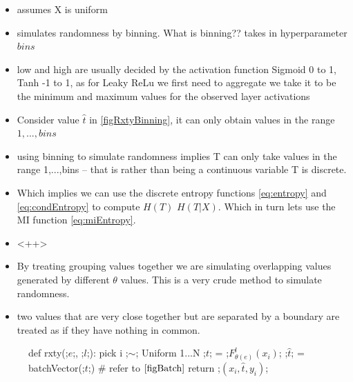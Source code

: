 \documentclass[dissertation.tex]{subfiles}
\begin{document}
\begin{itemize}
  \item{
      assumes X is uniform
    }
  \item{
      simulates randomness by binning. What is binning?? takes in hyperparameter
      $bins$
    }
  \item{
      low and high are usually decided by the activation function
      Sigmoid 0 to 1, Tanh -1 to 1, as for Leaky ReLu we first need to aggregate
      we take it to be the minimum and maximum values for the observed
      layer activations
    }
  \item{
      Consider value $\hat{t}$ in \autoref{figRxtyBinning}, it can only obtain
      values in the range $1,...,bins$
    }
  \item{
      using binning to simulate randomness implies T can only take values in the
      range {1,...,bins} -- that is rather than being a continuous variable T
      is discrete. 
    }
  \item{
      Which implies we can use the discrete entropy functions
      \autoref{eq:entropy} and \autoref{eq:condEntropy} to compute $H(T)$
      $H(T|X)$. Which in turn lets use the MI function \autoref{eq:miEntropy}.
    }
  \item{
      <++>
    }
  \item{
      By treating grouping values together we are simulating overlapping values
      generated by different $\theta$ values. This is a very crude method to
      simulate randomness.
    }
  \item{
      two values that are very close together but are separated by a boundary
      are treated as if they have nothing in common.
    }
\end{itemize}

\begin{figure}[H]
    \begin{pythonfigure}
      def rxty(;$e$;, ;$l$;):
        pick i ;$\sim$; Uniform {1...N}
        ;$t$; = ;$F_{\theta(e)}^l(x_i)$;
        ;$\hat{t}$; = batchVector(;$t$;) # refer to $\autoref{figBatch}$
        return ;$(x_i, \hat{t}, y_i)$;
    \end{pythonfigure}
    \caption{
    }
    \label{figRxtyBinning}
\end{figure}
\end{document}
